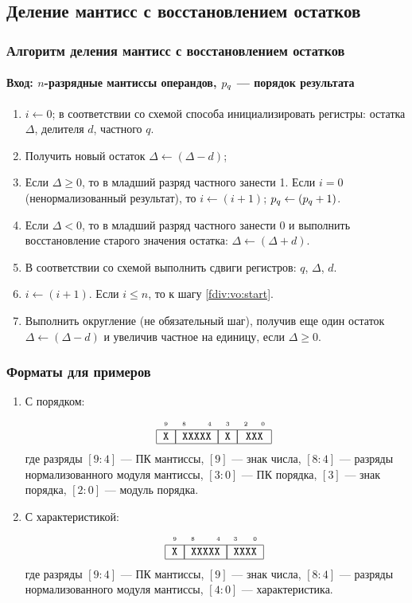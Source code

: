 \subsection{Деление мантисс с восстановлением остатков}


\begin{frame}
    \frametitle{Алгоритм деления мантисс с восстановлением остатков}
    \framesubtitle{Вход: $n$-разрядные мантиссы операндов, $p_{q}$ --- порядок результата}
    
    \begin{enumerate}
        \item $i\gets 0$; в соответствии со схемой способа инициализировать регистры: остатка $\Delta$, делителя $d$, частного $q$.
        \item\label{fdiv:vo:start} Получить новый остаток $\Delta\gets(\Delta - d)$;
        \item Если $\Delta \ge 0$, то в младший разряд частного занести 1. Если $i=0$ (ненормализованный результат), то $i\gets(i + 1)$; $p_{q}\gets(p_{q} + 1)$.
        \item Если $\Delta < 0$, то в младший разряд частного занести 0 и выполнить восстановление старого значения остатка: $\Delta\gets(\Delta + d)$.
        \item В соответствии со схемой выполнить сдвиги регистров: $q$, $\Delta$, $d$.
        \item $i\gets (i + 1)$. Если $i\le n$, то к шагу \ref{fdiv:vo:start}.
        \item Выполнить округление (не обязательный шаг), получив еще один остаток $\Delta\gets(\Delta - d)$ и увеличив частное на единицу, если $\Delta\ge 0$.
    \end{enumerate}
\end{frame}

\begin{frame}
    \frametitle{Форматы для примеров}

    \begin{enumerate}
        \item С порядком:
        \[
            \FloatMyOrderX{X}{XXXXX}{X}{XXX}
        \]
        где разряды $[9:4]$ --- ПК мантиссы, $[9]$ --- знак числа, $[8:4]$ --- разряды нормализованного модуля мантиссы, $[3:0]$ --- ПК порядка, $[3]$ --- знак порядка, $[2:0]$ --- модуль порядка.

        \item С характеристикой:
        \[
            \FloatMyCharX{X}{XXXXX}{XXXX}
        \]
        где разряды $[9:4]$ --- ПК мантиссы, $[9]$ --- знак числа, $[8:4]$ --- разряды нормализованного модуля мантиссы, $[4:0]$ --- характеристика.
    \end{enumerate}
\end{frame}

